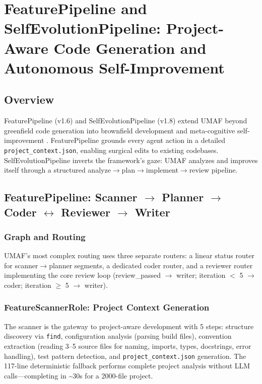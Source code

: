 \section{FeaturePipeline and SelfEvolutionPipeline: Project-Aware Code Generation and Autonomous Self-Improvement}
\label{sec:feature_selfevolution}

\subsection{Overview}

FeaturePipeline (v1.6) and SelfEvolutionPipeline (v1.8) extend UMAF beyond greenfield code generation into brownfield development \cite{wirl,cohesion} and meta-cognitive self-improvement \cite{godel,agentdevel,metaagent}. FeaturePipeline grounds every agent action in a detailed \texttt{project\_context.json}, enabling surgical edits to existing codebases. SelfEvolutionPipeline inverts the framework's gaze: UMAF analyzes and improves itself through a structured analyze$\rightarrow$plan$\rightarrow$implement$\rightarrow$review pipeline.

\subsection{FeaturePipeline: Scanner $\rightarrow$ Planner $\rightarrow$ Coder $\leftrightarrow$ Reviewer $\rightarrow$ Writer}

\subsubsection{Graph and Routing}

UMAF's most complex routing uses three separate routers: a linear status router for scanner$\rightarrow$planner segments, a dedicated coder router, and a reviewer router implementing the core review loop (review\_passed $\rightarrow$ writer; iteration $<$ 5 $\rightarrow$ coder; iteration $\ge$ 5 $\rightarrow$ writer).

\subsubsection{FeatureScannerRole: Project Context Generation}

The scanner is the gateway to project-aware development with 5 steps: structure discovery via \texttt{find}, configuration analysis (parsing build files), convention extraction (reading 3--5 source files for naming, imports, types, docstrings, error handling), test pattern detection, and \texttt{project\_context.json} generation. The 117-line deterministic fallback performs complete project analysis without LLM calls---completing in \textasciitilde30s for a 2000-file project.

